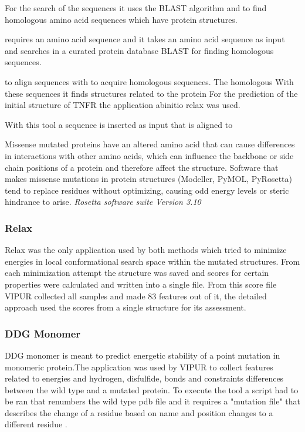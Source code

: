 For the search of the sequences it uses the BLAST algorithm and to find homologous amino acid sequences which have protein structures.

requires an amino acid sequence and  it takes an amino acid sequence as input and searches in a curated protein database BLAST for finding homologous sequences. 


to align sequences with to acquire homologous sequences.  The homologous With these sequences it finds structures related to the protein
For the prediction of the initial structure of TNFR the application abinitio relax was used. 

With this tool a sequence is inserted as input that is aligned to 


Missense mutated proteins have an altered amino acid that can cause differences in interactions with other amino acids, which can influence the backbone or side chain positions of a protein and therefore affect the structure. Software that makes missense mutations in protein structures (Modeller, PyMOL, PyRosetta) tend to replace residues without optimizing, causing odd energy levels or steric hindrance to arise.
\label{subsec:MM_Rosetta}
\newline
\textit{Rosetta software suite Version 3.10}

\subsubsection{Relax}
Relax was the only application used by both methods which tried to minimize energies in local conformational search space \cite{} within the mutated structures. From each minimization attempt the structure was saved and scores for certain properties were calculated and written into a single file. From this score file VIPUR collected all samples and made 83 features out of it, the detailed approach used the scores from a single structure for its assessment.
\label{subsubsec:MM_Relax}

\subsubsection{DDG Monomer}
DDG monomer is meant to predict energetic stability of a point mutation in  monomeric protein.The application was used by VIPUR to collect features related to energies and hydrogen, disfulfide, bonds and constraints differences between the wild type and a mutated protein. To execute the tool a script had to be ran that renumbers the wild type pdb file and it requires a "mutation file" that describes the change of a residue based on name and position changes to a different residue \cite{}.
\label{subsubsec:MM_DDG_Monomer}

